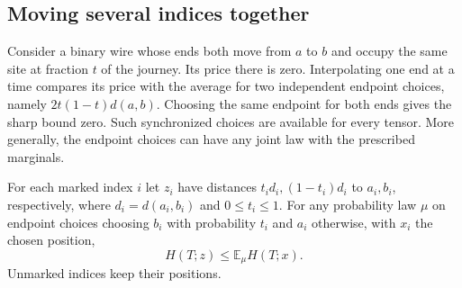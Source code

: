 \subsection{Moving several indices together}
Consider a binary wire whose ends both move from $a$ to $b$ and occupy
the same site at fraction $t$ of the journey. Its price there is zero.
Interpolating one end at a time compares its price with the average
for two independent endpoint choices, namely $2t(1-t)d(a,b)$. Choosing
the same endpoint for both ends gives the sharp bound zero. Such
synchronized choices are available for every tensor. More generally,
the endpoint choices can have any joint law with the prescribed marginals.
\begin{proposition}\label{prop:joint-convexity}
For each marked index $i$ let $z_i$ have distances
$t_i d_i,(1-t_i)d_i$ to $a_i,b_i$, respectively, where
$d_i=d(a_i,b_i)$ and $0\le t_i\le1$. For any probability law $\mu$
on endpoint choices choosing $b_i$ with probability $t_i$
and $a_i$ otherwise, with $x_i$ the chosen position,
\[
                 H(T;z)\le \mathbb E_\mu H(T;x).
\]
Unmarked indices keep their positions.
\end{proposition}

